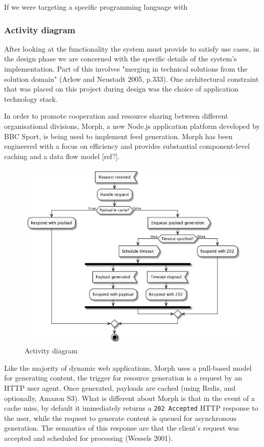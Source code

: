 \documentclass{article}
\begin{document}
If we were targeting a specific programming language with 

\subsubsection{Activity diagram}

After looking at the functionality the system must provide to satisfy use cases, in the design phase we are concerned with the specific details of the system's implementation. Part of this involves "merging in technical solutions from the solution domain" (Arlow and Neustadt 2005, p.333). One architectural constraint that was placed on this project during design was the choice of application technology stack.

In order to promote cooperation and resource sharing between different organisational divisions, Morph, a new Node.js application platform developed by BBC Sport, is being used to implement feed generation. Morph has been engineered with a focus on efficiency and provides substantial component-level caching and a data flow model [ref?].

\begin{figure}
  \begin{center}
    \includegraphics[width=\textwidth]{activity.png}
  \end{center}
  \label{activity}
  \caption{Activity diagram}
\end{figure}

Like the majority of dynamic web applications, Morph uses a pull-based model for generating content, the trigger for resource generation is a request by an HTTP user agent. Once generated, payloads are cached (using Redis, and optionally, Amazon S3). What is different about Morph is that in the event of a cache miss, by default it immediately returns a \texttt{202 Accepted} HTTP response to the user, while the request to generate content is queued for asynchronous generation. The semantics of this response are that the client's request was accepted and scheduled for processing (Wessels 2001).
\end{document}
